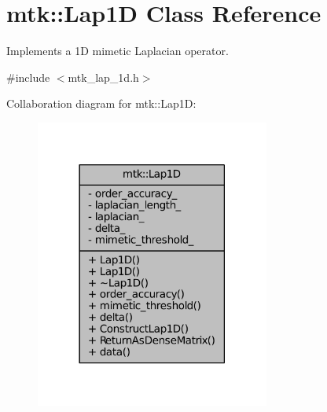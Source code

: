 \hypertarget{classmtk_1_1Lap1D}{\section{mtk\+:\+:Lap1\+D Class Reference}
\label{classmtk_1_1Lap1D}
}


Implements a 1\+D mimetic Laplacian operator.  




{\ttfamily \#include $<$mtk\+\_\+lap\+\_\+1d.\+h$>$}



Collaboration diagram for mtk\+:\+:Lap1\+D\+:
\nopagebreak
\begin{figure}[H]
\begin{center}
\leavevmode
\includegraphics[width=218pt]{classmtk_1_1Lap1D__coll__graph}
\end{center}
\end{figure}
